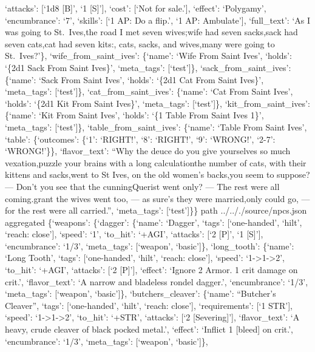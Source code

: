 \documentclass[
  letterpaper,
  DIV=11,
  numbers=noendperiod]{scrartcl}
\begin{document}
`attacks': {[}`1d8 {[}B{]}', `1 {[}S{]}'{]}, `cost': {[}`Not for
sale.'{]}, `effect': `Polygamy', `encumbrance': `7', `skills': {[}`1 AP:
Do a flip.', `1 AP: Ambulate'{]}, `full\_text': `As I was going to
St.~Ives,\nUpon the road I met seven wives;\nEvery wife had seven
sacks,\nEvery sack had seven cats,\nEvery cat had seven kits:\nKits,
cats, sacks, and wives,\nHow many were going to St.~Ives?'\},
`wife\_from\_saint\_ives': \{`name': `Wife From Saint Ives', `holds':
`\{2d1 Sack From Saint Ives\}', `meta\_tags': {[}`test'{]}\},
`sack\_from\_saint\_ives': \{`name': `Sack From Saint Ives', `holds':
`\{2d1 Cat From Saint Ives\}', `meta\_tags': {[}`test'{]}\},
`cat\_from\_saint\_ives': \{`name': `Cat From Saint Ives', `holds':
`\{2d1 Kit From Saint Ives\}', `meta\_tags': {[}`test'{]}\},
`kit\_from\_saint\_ives': \{`name': `Kit From Saint Ives', `holds': `\{1
Table From Saint Ives 1\}', `meta\_tags': {[}`test'{]}\},
`table\_from\_saint\_ives': \{`name': `Table From Saint Ives', `table':
\{`outcomes': \{`1': `RIGHT!', `8': `RIGHT!', `9': `WRONG!', `2-7':
`WRONG!'\}\}, `flavor\_text': ``Why the deuce do you give yourselves so
much vexation,\nAnd puzzle your brains with a long calculation\nOf the
number of cats, with their kittens and sacks,\nWhich went to St Ives, on
the old women's backs,\nAs you seem to suppose? --- Don't you see that
the cunning\nOld Querist went only? --- The rest were all
coming.\nBut grant the wives went too, --- as sure's they were
married,\nEight only could go, --- for the rest were all carried.'',
`meta\_tags': {[}`test'{]}\}\} path ../.././source/npcs.json aggregated
\{`weapons': \{`dagger': \{`name': `Dagger', `tags': {[}`one-handed',
`hilt', `reach: close'{]}, `speed': `1', `to\_hit': `+AGI', `attacks':
{[}`2 {[}P{]}', `1 {[}S{]}'{]}, `encumbrance': `1/3', `meta\_tags':
{[}`weapon', `basic'{]}\}, `long\_tooth': \{`name': `Long Tooth',
`tags': {[}`one-handed', `hilt', `reach: close'{]}, `speed':
`1-\textgreater1-\textgreater2', `to\_hit': `+AGI', `attacks': {[}`2
{[}P{]}'{]}, `effect': `Ignore 2 Armor. 1 crit damage on crit.',
`flavor\_text': `A narrow and bladeless rondel dagger.', `encumbrance':
`1/3', `meta\_tags': {[}`weapon', `basic'{]}\}, `butchers\_cleaver':
\{`name': ``Butcher's Cleaver'', `tags': {[}`one-handed', `hilt',
`reach: close'{]}, `requirements': {[}`1 STR'{]}, `speed':
`1-\textgreater1-\textgreater2', `to\_hit': `+STR', `attacks': {[}`2
{[}Severing{]}'{]}, `flavor\_text': `A heavy, crude cleaver of black
pocked metal.', `effect': `Inflict 1 {[}bleed{]} on crit.',
`encumbrance': `1/3', `meta\_tags': {[}`weapon', `basic'{]}\},
\end{document}
